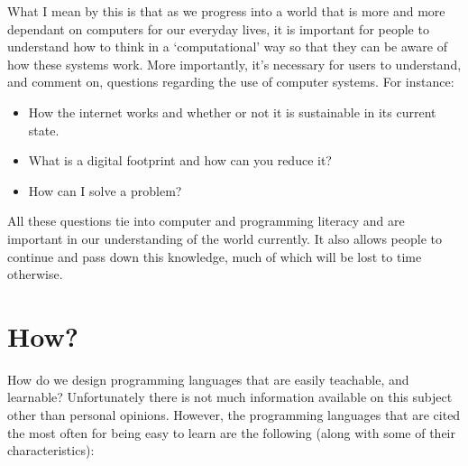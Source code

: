 What I mean by this is that as we progress into a world that is more and more dependant on computers for our everyday lives, it is important for people to understand how to think in a `computational' way so that they can be aware of how these systems work. More importantly, it's necessary for users to understand, and comment on, questions regarding the use of computer systems. For instance:

\begin{itemize}
    \item How the internet works and whether or not it is sustainable in its current state.
    \item What is a digital footprint and how can you reduce it?
    \item How can I solve a problem?
\end{itemize}

All these questions tie into computer and programming literacy and are important in our understanding of the world currently. It also allows people to continue and pass down this knowledge, much of which will be lost to time otherwise.

\section{How?}

How do we design programming languages that are easily teachable, and learnable? Unfortunately there is not much information available on this subject other than personal opinions. However, the programming languages that are cited the most often for being easy to learn are the following (along with some of their characteristics):

